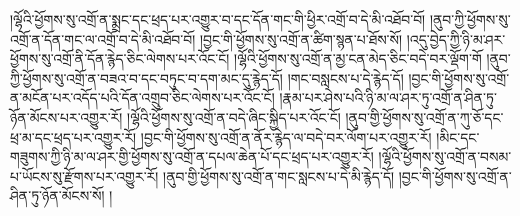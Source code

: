 །ལྷོའི་ཕྱོགས་སུ་འགྲོ་ན་སྨྲང་དང་ཕྲད་པར་འགྱུར་བ་དང་དོན་གང་གི་ཕྱིར་འགྲོ་བ་དེ་མི་འཐོབ་བོ། །ནུབ་ཀྱི་ཕྱོགས་སུ་འགྲོ་ན་དོན་གང་ལ་འགྲོ་བ་དེ་མི་འཐོབ་བོ། །བྱང་གི་ཕྱོགས་སུ་འགྲོ་ན་ཚིག་སྙན་པ་ཐོས་སོ། །འདུ་བྱེད་ཀྱི་ཉི་མ་ཤར་ཕྱོགས་སུ་འགྲོ་ནི་དོན་རྙེད་ཅིང་ལེགས་པར་འོང་ངོ། །ལྷོའི་ཕྱོགས་སུ་འགྲོ་ན་མྱ་ངན་མེད་ཅིང་བདེ་བར་ལྡོག་གོ །ནུབ་ཀྱི་ཕྱོགས་སུ་འགྲོ་ན་བཟའ་བ་དང་བཏུང་བ་དག་མང་དུ་རྙེད་དོ། །གང་བསླངས་པ་དེ་རྙེད་དོ། །བྱང་གི་ཕྱོགས་སུ་འགྲོ་ན་མངོན་པར་འདོད་པའི་དོན་འགྲུབ་ཅིང་ལེགས་པར་འོང་ངོ། །རྣམ་པར་ཤེས་པའི་ཉི་མ་ལ་ཤར་ཏུ་འགྲོ་ན་ཤིན་ཏུ་ཉོན་མོངས་པར་འགྱུར་རོ། །ལྷོའི་ཕྱོགས་སུ་འགྲོ་ན་བདེ་ཞིང་སྐྱིད་པར་འོང་ངོ། །ནུབ་གྱི་ཕྱོགས་སུ་འགྲོ་ན་ཀུ་ཅོ་དང་ཕྲ་མ་དང་ཕྲད་པར་འགྱུར་རོ། །བྱང་གི་ཕྱོགས་སུ་འགྲོ་ན་ནོར་རྙེད་ལ་བདེ་བར་ལོག་པར་འགྱུར་རོ། །མིང་དང་གཟུགས་ཀྱི་ཉི་མ་ལ་ཤར་གྱི་ཕྱོགས་སུ་འགྲོ་ན་དཔལ་ཆེན་པོ་དང་ཕྲད་པར་འགྱུར་རོ། །ལྷོའི་ཕྱོགས་སུ་འགྲོ་ན་བསམ་པ་ཡོངས་སུ་རྫོགས་པར་འགྱུར་རོ། །ནུབ་གྱི་ཕྱོགས་སུ་འགྲོ་ན་གང་སླངས་པ་དེ་མི་རྙེད་དོ། །བྱང་གི་ཕྱོགས་སུ་འགྲོ་ན་ཤིན་ཏུ་ཉོན་མོངས་སོ། །
